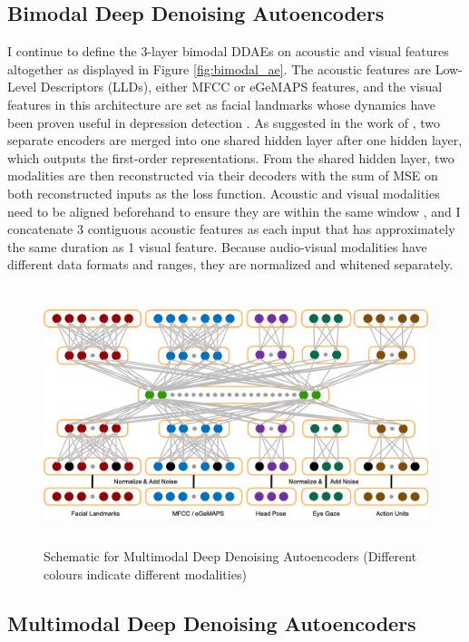 \subsection{Bimodal Deep Denoising Autoencoders}

I continue to define the 3-layer bimodal DDAEs on acoustic and visual features altogether as displayed in Figure \ref{fig:bimodal_ae}. The acoustic features are Low-Level Descriptors (LLDs), either MFCC or eGeMAPS features, and the visual features in this architecture are set as facial landmarks whose dynamics have been proven useful in depression detection \cite{dibekliouglu2017}. As suggested in the work of \cite{ngiam2011}, two separate encoders are merged into one shared hidden layer after one hidden layer, which outputs the first-order representations. From the shared hidden layer, two modalities are then reconstructed via their decoders with the sum of MSE on both reconstructed inputs as the loss function. 
Acoustic and visual modalities need to be aligned beforehand to ensure they are within the same window \cite{ngiam2011}, and I concatenate 3 contiguous acoustic features as each input that has approximately the same duration as 1 visual feature. Because audio-visual modalities have different data formats and ranges, they are normalized and whitened separately.

\begin{figure}[ht]
    \centering
    \includegraphics[height=7.5cm]{images/design/multimodal_ae.png}
    \caption{Schematic for Multimodal Deep Denoising Autoencoders (Different colours indicate different modalities)}
    \label{fig:multimodal_ae}
\end{figure}

\subsection{Multimodal Deep Denoising Autoencoders}

